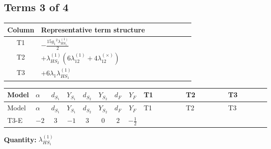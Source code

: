 \documentclass[8pt]{article}
\begin{document}
\begin{landscape}
\subsection*{Terms 3 of 4}
\begin{center}
\begin{tabular}{@{}c >{\raggedright\arraybackslash}p{0.82\linewidth}@{}}
\toprule
Column & Representative term structure \\
\midrule
T1 & \(\displaystyle -\frac{15 {g_1}^2 {\lambda_{HS_1}^{(1)}}}{2}\) \\
\midrule
T2 & \(\displaystyle +{\lambda_{HS_2}^{(1)}} (6 {\lambda_{12}^{(1)}}+4 {\lambda_{12}^{(\times)}})\) \\
\midrule
T3 & \(\displaystyle +6 {\lambda_1} {\lambda_{HS_1}^{(1)}}\) \\
\midrule
\bottomrule
\end{tabular}
\end{center}
\smallskip
\tiny
\begin{longtable}{@{}llcccccc >{\raggedright\arraybackslash}p{0.21\linewidth} >{\raggedright\arraybackslash}p{0.21\linewidth} >{\raggedright\arraybackslash}p{0.21\linewidth}@{}}
\toprule
Model & $\alpha$ & $d_{S_1}$ & $Y_{S_1}$ & $d_{S_2}$ & $Y_{S_2}$ & $d_F$ & $Y_F$ & T1 & T2 & T3 \\
\midrule
\endfirsthead
\toprule
Model & $\alpha$ & $d_{S_1}$ & $Y_{S_1}$ & $d_{S_2}$ & $Y_{S_2}$ & $d_F$ & $Y_F$ & T1 & T2 & T3 \\
\midrule
\endhead
T3-E & $-2$ & $3$ & $-1$ & $3$ & $0$ & $2$ & $-\frac{1}{2}$ & \scriptsize\adjustbox{max width=\linewidth}{$\begin{gathered} -\frac{15 {g_1}^2 {\lambda_{HS_1}^{(1)}}}{2}\end{gathered}$} & \scriptsize\adjustbox{max width=\linewidth}{$\begin{gathered} +{\lambda_{HS_2}^{(1)}} (6 {\lambda_{12}^{(1)}}+4 {\lambda_{12}^{(\times)}})\end{gathered}$} & \scriptsize\adjustbox{max width=\linewidth}{$\begin{gathered} +6 {\lambda_1} {\lambda_{HS_1}^{(1)}}\end{gathered}$} \\
\midrule
\bottomrule
\end{longtable}
\clearpage
\noindent\textbf{Quantity: }$\lambda_{HS_1}^{(1)}$\par\smallskip

\end{landscape}
\end{document}
